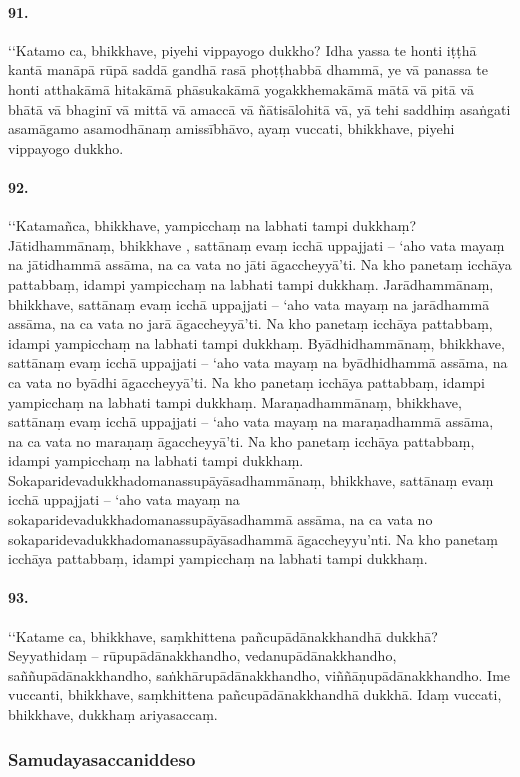 \paragraph{91.} ‘‘Katamo ca, bhikkhave, piyehi vippayogo dukkho? Idha yassa te honti iṭṭhā kantā manāpā rūpā saddā gandhā rasā phoṭṭhabbā dhammā, ye vā panassa te honti atthakāmā hitakāmā phāsukakāmā yogakkhemakāmā mātā vā pitā vā bhātā vā bhaginī vā mittā vā amaccā vā ñātisālohitā vā, yā tehi saddhiṃ asaṅgati asamāgamo asamodhānaṃ amissībhāvo, ayaṃ vuccati, bhikkhave, piyehi vippayogo dukkho.

\paragraph{92.} ‘‘Katamañca, bhikkhave, yampicchaṃ na labhati tampi dukkhaṃ? Jātidhammānaṃ, bhikkhave , sattānaṃ evaṃ icchā uppajjati – ‘aho vata mayaṃ na jātidhammā assāma, na ca vata no jāti āgaccheyyā’ti. Na kho panetaṃ icchāya pattabbaṃ, idampi yampicchaṃ na labhati tampi dukkhaṃ. Jarādhammānaṃ, bhikkhave, sattānaṃ evaṃ icchā uppajjati – ‘aho vata mayaṃ na jarādhammā assāma, na ca vata no jarā āgaccheyyā’ti. Na kho panetaṃ icchāya pattabbaṃ, idampi yampicchaṃ na labhati tampi dukkhaṃ. Byādhidhammānaṃ, bhikkhave, sattānaṃ evaṃ icchā uppajjati – ‘aho vata mayaṃ na byādhidhammā assāma, na ca vata no byādhi āgaccheyyā’ti. Na kho panetaṃ icchāya pattabbaṃ, idampi yampicchaṃ na labhati tampi dukkhaṃ. Maraṇadhammānaṃ, bhikkhave, sattānaṃ evaṃ icchā uppajjati – ‘aho vata mayaṃ na maraṇadhammā assāma, na ca vata no maraṇaṃ āgaccheyyā’ti. Na kho panetaṃ icchāya pattabbaṃ, idampi yampicchaṃ na labhati tampi dukkhaṃ. Sokaparidevadukkhadomanassupāyāsadhammānaṃ, bhikkhave, sattānaṃ evaṃ icchā uppajjati – ‘aho vata mayaṃ na sokaparidevadukkhadomanassupāyāsadhammā assāma, na ca vata no sokaparidevadukkhadomanassupāyāsadhammā āgaccheyyu’nti. Na kho panetaṃ icchāya pattabbaṃ, idampi yampicchaṃ na labhati tampi dukkhaṃ.

\paragraph{93.} ‘‘Katame ca, bhikkhave, saṃkhittena pañcupādānakkhandhā dukkhā? Seyyathidaṃ – rūpupādānakkhandho, vedanupādānakkhandho, saññupādānakkhandho, saṅkhārupādānakkhandho, viññāṇupādānakkhandho. Ime vuccanti, bhikkhave, saṃkhittena pañcupādānakkhandhā dukkhā. Idaṃ vuccati, bhikkhave, dukkhaṃ ariyasaccaṃ.

\subsubsection{Samudayasaccaniddeso}

